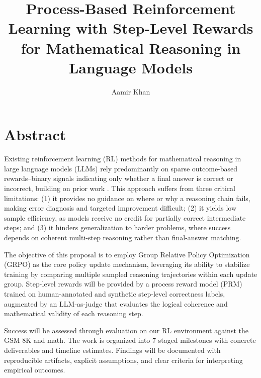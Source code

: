 \documentclass[11pt]{article}
\title{Process-Based Reinforcement Learning with Step-Level Rewards for Mathematical Reasoning in Language Models}
\author{Aamir Khan}
\date{}
\begin{document}
\maketitle

\section*{Abstract}
Existing reinforcement learning (RL) methods for mathematical reasoning in large language models (LLMs) rely predominantly on sparse outcome-based rewards--binary signals indicating only whether a final answer is correct or incorrect, building on prior work \citep{lightman2023, wang2023}.  This approach suffers from three critical limitations: (1) it provides no guidance on where or why a reasoning chain fails, making error diagnosis and targeted improvement difficult; (2) it yields low sample efficiency, as models receive no credit for partially correct intermediate steps; and (3) it hinders generalization to harder problems, where success depends on coherent multi-step reasoning rather than final-answer matching.

The objective of this proposal is to employ Group Relative Policy Optimization (GRPO) as the core policy update mechanism, leveraging its ability to stabilize training by comparing multiple sampled reasoning trajectories within each update group.  Step-level rewards will be provided by a process reward model (PRM) trained on human-annotated and synthetic step-level correctness labels, augmented by an LLM-as-judge that evaluates the logical coherence and mathematical validity of each reasoning step.

Success will be assessed through evaluation on our RL environment against the GSM 8K and math.  The work is organized into 7 staged milestones with concrete deliverables and timeline estimates.  Findings will be documented with reproducible artifacts, explicit assumptions, and clear criteria for interpreting empirical outcomes.
\end{document}

